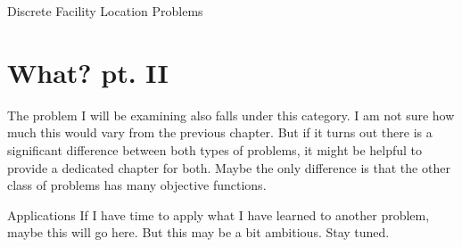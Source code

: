 \documentclass[12pt]{pom_thesis}
\theoremstyle{definition}
\begin{document}
\begin{chapter}{Discrete Facility Location Problems}
\section{What? pt. II}
The problem I will be examining also falls under this category. I am not sure how much this would vary from the previous chapter. But if it turns out there is a significant difference between both types of problems, it might be helpful to provide a dedicated chapter for both. Maybe the only difference is that the other class of problems has many objective functions.
\end{chapter}

\begin{chapter}{Applications}
If I have time to apply what I have learned to another problem, maybe this will go here. But this may be a bit ambitious. Stay tuned.
\end{chapter}
\end{document}
